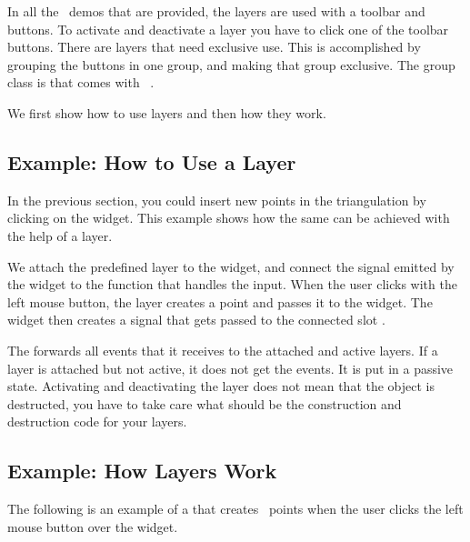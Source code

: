 \begin{ccAdvanced}
In all the \cgal\ demos that are provided, the layers are used with a
toolbar and buttons. To activate and deactivate a layer you have to
click one of the toolbar buttons. There are layers that need exclusive 
use. This is accomplished by grouping the buttons in one group, and
making that group exclusive. The group class is  that
comes with \qt\ .
\end{ccAdvanced}

We first show how to use layers and then how they work.

\subsection{Example: How to Use a Layer}

In the previous section, you could insert new points in the
triangulation by clicking on the widget. This example shows how
the same can be achieved with the help of a layer.

We attach the predefined layer  to the widget,
and connect the signal emitted by the widget to the function that
handles the input.  When the user clicks with the left mouse button,
the layer creates a point and passes it to the widget. The widget then
creates a signal that gets passed to the connected slot
.


The  forwards all events that it receives to the
attached and active layers. If a layer is attached but not active, it
does not get the events. It is put in a passive state. Activating and
deactivating the layer does not mean that the object is destructed,
you have to take care what should be the construction and destruction
code for your layers.

\subsection{Example: How Layers Work}

The following is an example of a  that creates \cgal\ points when
the user clicks the left mouse button over the widget. 
 
